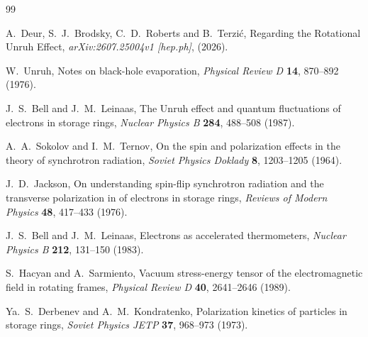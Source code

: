 \documentclass[review]{elsarticle}
\theoremstyle{plain}
\begin{document}

\begin{thebibliography}{99}


A.~Deur, S.~J.~Brodsky, C.~D.~Roberts and B.~Terzi{\'c},
Regarding the Rotational Unruh Effect,
\textit{arXiv:2607.25004v1 [hep.ph]}, (2026).

  W.~Unruh, Notes on black-hole evaporation,
  \textit{Physical Review D} {\bf 14}, 870--892 (1976).

  J.~S.~Bell and J.~M.~Leinaas, The Unruh effect and quantum fluctuations of electrons in storage rings,
  \textit{Nuclear Physics B} {\bf 284}, 488--508 (1987).

A.~A.~Sokolov and I.~M.~Ternov, On the spin and polarization effects in the theory of synchrotron radiation,
\textit{Soviet Physics Doklady} {\bf 8}, 1203--1205 (1964).

J.~D.~Jackson, On understanding spin-flip synchrotron radiation and the transverse polarization in of electrons in storage rings,
\textit{Reviews of Modern Physics} {\bf 48}, 417--433 (1976).

  J.~S.~Bell and J.~M.~Leinaas, Electrons as accelerated thermometers,
  \textit{Nuclear Physics B} {\bf 212}, 131--150 (1983).


S.~Hacyan and A.~Sarmiento, Vacuum stress-energy tensor of the electromagnetic field in rotating frames,
\textit{Physical Review D} {\bf 40}, 2641--2646 (1989).

Ya.~S.~Derbenev and A.~M.~Kondratenko, Polarization kinetics of particles in storage rings,
\textit{Soviet Physics JETP} {\bf 37}, 968--973 (1973).



\end{thebibliography}
\end{document}
